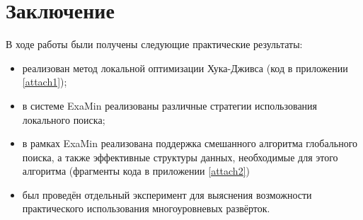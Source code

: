 \section{Заключение}
В ходе работы были получены следующие практические результаты:
\begin{itemize}
  \item реализован метод локальной оптимизации Хука-Дживса (код в приложении \ref{attach1});
  \item в системе ExaMin реализованы различные стратегии использования локального поиска;
  \item в рамках ExaMin реализована поддержка смешанного алгоритма глобального поиска, а также эффективные структуры данных, необходимые для этого алгоритма (фрагменты кода в приложении \ref{attach2})
  \item был проведён отдельный эксперимент для выяснения возможности практического использования многоуровневых развёрток.
\end{itemize}
